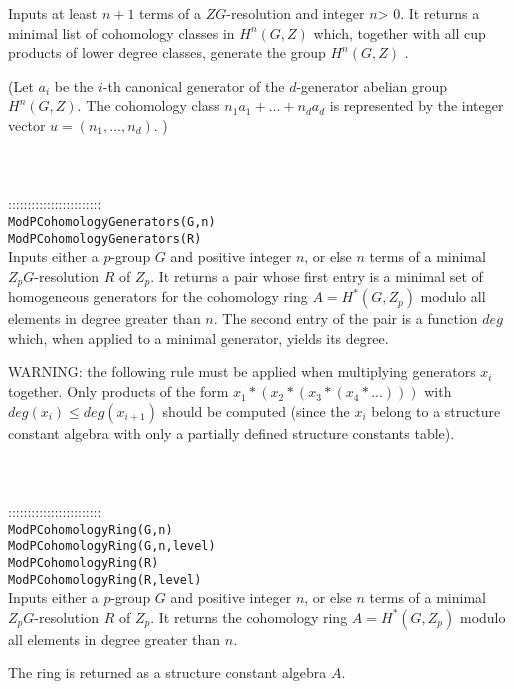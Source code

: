 \documentclass[a4paper,11pt]{report}
\begin{document}
{ Inputs at least $n+1$ terms of a $ZG$-resolution and integer $n${\textgreater} $0$. It returns a minimal list of cohomology classes in $H^n(G,Z)$ which, together with all cup products of lower degree classes, generate the
group $H^n(G,Z)$ . 

 (Let $a_i$ be the $i$-th canonical generator of the $d$-generator abelian group $H^n(G,Z)$. The cohomology class $n_1a_1 + ... +n_da_d$ is represented by the integer vector $u=(n_1, ..., n_d)$. ) \\
 \\
 \\
 \\
 ::::::::::::::::::::::::\\
 \texttt{ModPCohomologyGenerators(G,n) }\\
 \texttt{ModPCohomologyGenerators(R) }\\
 

 Inputs either a $p$-group $G$ and positive integer $n$, or else $n$ terms of a minimal $Z_pG$-resolution $R$ of $Z_p$. It returns a pair whose first entry is a minimal set of homogeneous
generators for the cohomology ring $A=H^*(G,Z_p)$ modulo all elements in degree greater than $n$. The second entry of the pair is a function $deg$ which, when applied to a minimal generator, yields its degree. 

 WARNING: the following rule must be applied when multiplying generators $x_i$ together. Only products of the form $x_1*(x_2*(x_3*(x_4*...)))$ with $deg(x_i) \le deg(x_{i+1})$ should be computed (since the $x_i$ belong to a structure constant algebra with only a partially defined structure
constants table). \\
 \\
 \\
 \\
 ::::::::::::::::::::::::\\
 \texttt{ModPCohomologyRing(G,n) }\\
 \texttt{ModPCohomologyRing(G,n,level) }\\
 \texttt{ModPCohomologyRing(R) }\\
 \texttt{ModPCohomologyRing(R,level)}\\
 

 Inputs either a $p$-group $G$ and positive integer $n$, or else $n$ terms of a minimal $Z_pG$-resolution $R$ of $Z_p$. It returns the cohomology ring $A=H^*(G,Z_p)$ modulo all elements in degree greater than $n$. 

 The ring is returned as a structure constant algebra $A$. 

}
\end{document}
